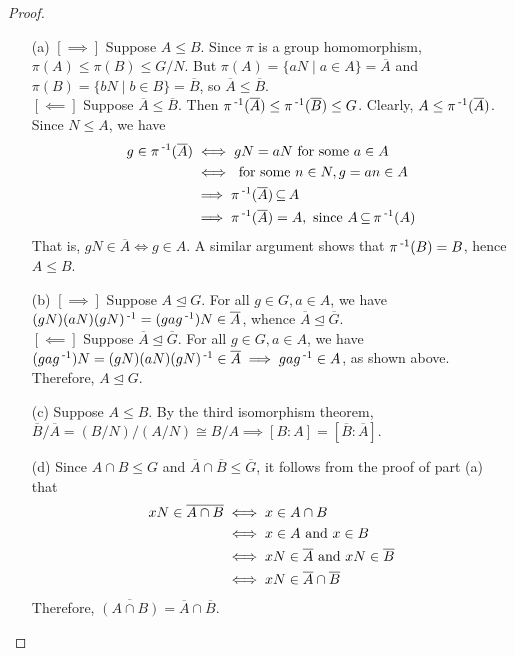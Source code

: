 \documentclass[11pt]{book}
\theoremstyle{definition}   \newtheorem{defn}[counter]{Definition} %
\newcommand{\ov}{\overline}   \newcommand{\wt}{\widetilde}
\newcommand{\nsg}{\mathrel{\unlhd}}   \newcommand{\ind}{\parindent24pt}   \newcommand{\vn}{\varnothing}
\numberwithin{counter}{chapter}
\begin{document}
\begin{proof} \
\begin{enumerate}
\item[(a)] $[\implies]$ Suppose $A \leq B$. Since $\pi$ is a group homomorphism, $\pi(A) \leq \pi (B) \leq G/N$. But $\pi(A) = \{aN \mid a \in A\} = \ov{A}$ and $\pi(B) = \{bN \mid b \in B\} = \ov{B}$, so $\ov{A} \leq \ov{B}$. \\
$[\impliedby]$ Suppose $\ov{A} \leq \ov{B}$. Then $\pi\inv (\ov{A}) \leq \pi \inv(\ov{B}) \leq G$. Clearly, $A \leq \pi\inv(\ov{A})$. Since $N \leq A$, we have
	\begin{align*}
	g \in \pi\inv(\ov{A}) & \iff gN = aN \textnormal{ for some } a \in A \\
	&\iff \textnormal{ for some } n \in N, g = an \in A \\
	&\implies \pi\inv(\ov{A}) \sub A \\
	&\implies \pi\inv(\ov{A}) = A, \textnormal{ since } A \sub \pi\inv({A})
	\end{align*}
That is, $gN \in \ov{A} \iff g \in A$. A similar argument shows that $\pi\operatorname{^{-1}}({B}) = B$, hence $A \leq B$. \\

\item[(b)] $[\implies]$ Suppose $A \nsg G$. For all $g \in G, a \in A$, we have $(gN)(aN)(gN)\inv = (gag\inv) N \in \ov{A}$, whence $\ov{A} \nsg \ov{G}$. \\
$[\impliedby]$ Suppose $\ov{A} \nsg \ov{G}$. For all $g \in G, a \in A$, we have $(gag\inv)N = (gN)(aN)(gN)\inv \in \ov{A} \implies gag\inv \in A$, as shown above. Therefore, $A \nsg G$. \\

\item[(c)] Suppose $A \leq B$. By the third isomorphism theorem, $\ov{B}/\ov{A} = (B/N)/(A/N) \cong B/A \implies [B : A] = [\ov{B} : \ov{A}]$. \\

\item[(d)] Since $A\cap B \leq G$ and $\ov{A} \cap \ov{B} \leq \ov{G}$, it follows from the proof of part (a) that
	\begin{align*}
	xN \in \ov{A\cap B} &\iff x \in A \cap B \\
	&\iff x \in A \textnormal{ and } x \in B \\
	&\iff xN \in \ov{A} \tn{ and } xN \in \ov{B} \\
	&\iff xN \in \ov{A} \cap \ov{B}
	\end{align*}
Therefore, $\ov{(A \cap B)} = \ov{A} \cap \ov{B}$. \\


\end{enumerate}
\end{proof}
\end{document}
